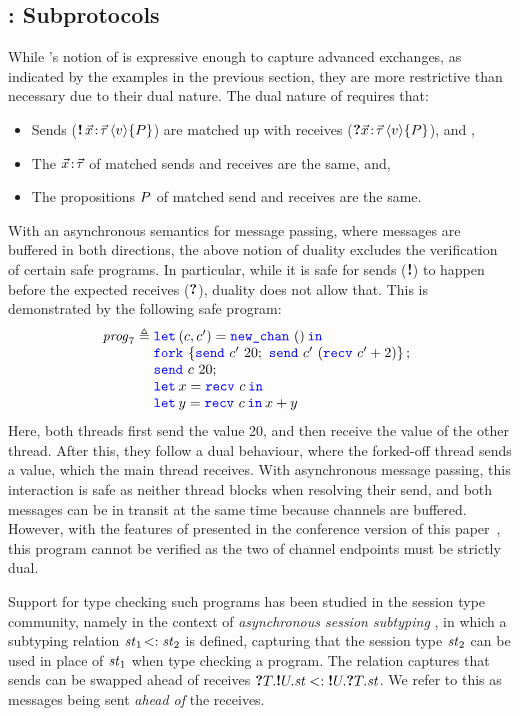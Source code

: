 \subsection{: Subprotocols}
\label{sec:subprotocol_intro}
While 's notion of \pname is expressive enough to capture advanced exchanges,
as indicated by the examples in the previous section, they are more restrictive than necessary
due to their dual nature.
The dual nature of \pname requires that:
\begin{itemize}
\item Sends ($\sendprotHead {\xdots} \val \iprop$)
  are matched up with receives ($\recvprotHead {\xdots} \val \iprop$), and \viceversa,
\item The \binders $\vec{x}\!:\!\vec{\tau}$ of matched sends and receives are the same, and,
\item The propositions $P$ of matched send and receives are the same.
\end{itemize}
With an asynchronous semantics for message passing, where messages are buffered in both directions,
the above notion of duality excludes the verification of certain safe programs.
In particular, while it is safe for sends ($\textnormal{\bf !}$) to happen before the expected receives
($\textnormal{\bf ?}$), duality does not allow that.
This is demonstrated by the following safe program:
\[
{\mathit {prog}_7}\eqdef
\begin{array}[t]{@{} l}
\Let {(\chan,\chan')} = \newchan in \\
\Fork{\send{\chan'}{20};\
      \send {\chan'} ({\recv {\chan'} + 2})}; \\
\send \chan 20; \\
\Let \var = {\recv \chan} in\\
\Let \varB = {\recv \chan} in \var + \varB
\end{array}
\]
Here, both threads first send the value 20, and then receive the value of the other
thread.
After this, they follow a dual behaviour, where the forked-off thread sends a value,
which the main thread receives.
With asynchronous message passing, this interaction is safe as neither thread
blocks when resolving their send, and
both messages can be in transit at the same time because channels are buffered.
However, with the features of \lname 1.0 presented in the conference version of
this paper~\cite{DBLP:journals/pacmpl/HinrichsenBK20}, this program cannot be
verified as the two \pname of channel endpoints must be strictly dual.

Support for type checking such programs has been studied in the session type
community,
namely in the context of \emph{asynchronous session subtyping}
\cite{mostrous-ESOP2009,mostrous-InfComput2015},
in which a subtyping relation
$\mathit{st}_1 \! <: \mathit{st}_2$ is defined,
capturing that the session type $\mathit{st}_2$ can be used in place of $\mathit{st}_1$
when type checking a program.
The relation captures that sends can be swapped ahead of receives
$\textnormal{\bf ?}{T}.\textnormal{\bf !}{U}.\mathit{st} <: \textnormal{\bf !}{U}.\textnormal{\bf ?}{T}.\mathit{st}$.
We refer to this as messages being sent \textit{ahead of} the receives.

